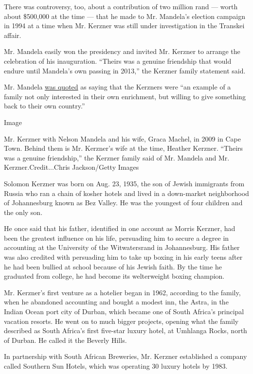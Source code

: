 There was controversy, too, about a contribution of two million rand ---
worth about \$500,000 at the time --- that he made to Mr. Mandela's
election campaign in 1994 at a time when Mr. Kerzner was still under
investigation in the Transkei affair.

Mr. Mandela easily won the presidency and invited Mr. Kerzner to arrange
the celebration of his inauguration. ``Theirs was a genuine friendship
that would endure until Mandela's own passing in 2013,'' the Kerzner
family statement said.

Mr. Mandela
\href{https://www.theguardian.com/business/2006/may/07/theobserver.observerbusiness10}{was
quoted} as saying that the Kerzners were ``an example of a family not
only interested in their own enrichment, but willing to give something
back to their own country.''

Image

Mr. Kerzner with Nelson Mandela and his wife, Graca Machel, in 2009 in
Cape Town. Behind them is Mr. Kerzner's wife at the time, Heather
Kerzner. ``Theirs was a genuine friendship,'' the Kerzner family said of
Mr. Mandela and Mr. Kerzner.Credit...Chris Jackson/Getty Images

Solomon Kerzner was born on Aug. 23, 1935, the son of Jewish immigrants
from Russia who ran a chain of kosher hotels and lived in a down-market
neighborhood of Johannesburg known as Bez Valley. He was the youngest of
four children and the only son.

He once said that his father, identified in one account as Morris
Kerzner, had been the greatest influence on his life, persuading him to
secure a degree in accounting at the University of the Witwatersrand in
Johannesburg. His father was also credited with persuading him to take
up boxing in his early teens after he had been bullied at school because
of his Jewish faith. By the time he graduated from college, he had
become its welterweight boxing champion.

Mr. Kerzner's first venture as a hotelier began in 1962, according to
the family, when he abandoned accounting and bought a modest inn, the
Astra, in the Indian Ocean port city of Durban, which became one of
South Africa's principal vacation resorts. He went on to much bigger
projects, opening what the family described as South Africa's first
five-star luxury hotel, at Umhlanga Rocks, north of Durban. He called it
the Beverly Hills.

In partnership with South African Breweries, Mr. Kerzner established a
company called Southern Sun Hotels, which was operating 30 luxury hotels
by 1983.

